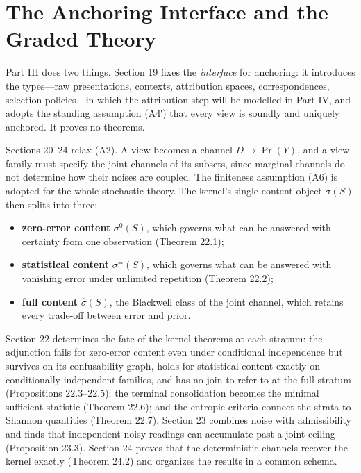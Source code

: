 \part{The Anchoring Interface and the Graded Theory}


Part III does two things. Section 19 fixes the \emph{interface} for anchoring: it introduces the types---\hspace{0pt}raw presentations, contexts, attribution spaces, correspondences, selection policies---\hspace{0pt}in which the attribution step will be modelled in Part IV, and adopts the standing assumption (A4′) that every view is soundly and uniquely anchored. It proves no theorems.

Sections 20--24 relax (A2). A view becomes a channel \(D \to \Pr(Y)\), and a view family must specify the joint channels of its subsets, since marginal channels do not determine how their noises are coupled. The finiteness assumption (A6) is adopted for the whole stochastic theory. The kernel's single content object \(\sigma(S)\) then splits into three:

\begin{itemize}
\tightlist
\item
  \textbf{zero-error content} \(\sigma^0(S)\), which governs what can be answered with certainty from one observation (Theorem 22.1);
\item
  \textbf{statistical content} \(\sigma^{=}(S)\), which governs what can be answered with vanishing error under unlimited repetition (Theorem 22.2);
\item
  \textbf{full content} \(\widehat\sigma(S)\), the Blackwell class of the joint channel, which retains every trade-off between error and prior.
\end{itemize}

Section 22 determines the fate of the kernel theorems at each stratum: the adjunction fails for zero-error content even under conditional independence but survives on its confusability graph, holds for statistical content exactly on conditionally independent families, and has no join to refer to at the full stratum (Propositions 22.3--22.5); the terminal consolidation becomes the minimal sufficient statistic (Theorem 22.6); and the entropic criteria connect the strata to Shannon quantities (Theorem 22.7). Section 23 combines noise with admissibility and finds that independent noisy readings can accumulate past a joint ceiling (Proposition 23.3). Section 24 proves that the deterministic channels recover the kernel exactly (Theorem 24.2) and organizes the results in a common schema.

